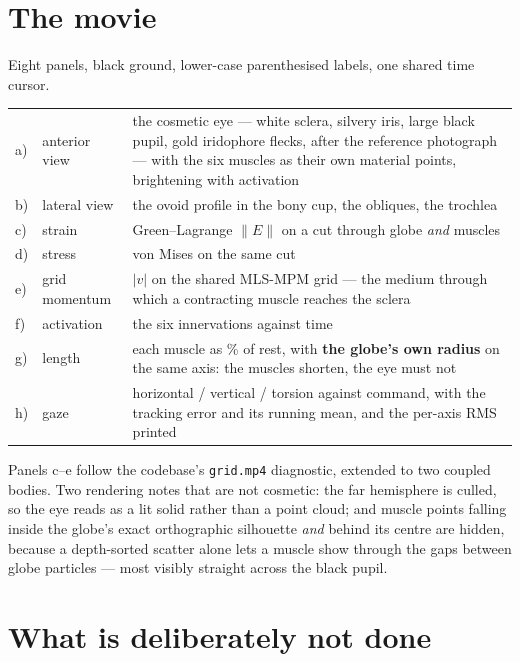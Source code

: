 \documentclass[11pt,a4paper]{article}
\newcommand{\code}[1]{\texttt{#1}}
\begin{document}
\section{The movie}

Eight panels, black ground, lower-case parenthesised labels, one shared time cursor.

\begin{center}\small
\begin{tabular}{@{}llp{8.4cm}@{}}
\toprule
a) & anterior view & the cosmetic eye --- white sclera, silvery iris, large black pupil, gold iridophore flecks, after the reference photograph --- with the six muscles as their own material points, brightening with activation \\
b) & lateral view & the ovoid profile in the bony cup, the obliques, the trochlea \\
c) & strain & Green--Lagrange $\|E\|$ on a cut through globe \emph{and} muscles \\
d) & stress & von Mises on the same cut \\
e) & grid momentum & $|v|$ on the shared MLS-MPM grid --- the medium through which a contracting muscle reaches the sclera \\
f) & activation & the six innervations against time \\
g) & length & each muscle as \% of rest, with \textbf{the globe's own radius} on the same axis: the muscles shorten, the eye must not \\
h) & gaze & horizontal / vertical / torsion against command, with the tracking error and its running mean, and the per-axis RMS printed \\
\bottomrule
\end{tabular}
\end{center}

Panels c--e follow the codebase's \code{grid.mp4} diagnostic, extended to two coupled bodies. Two
rendering notes that are not cosmetic: the far hemisphere is culled, so the eye reads as a lit solid
rather than a point cloud; and muscle points falling inside the globe's exact orthographic
silhouette \emph{and} behind its centre are hidden, because a depth-sorted scatter alone lets a
muscle show through the gaps between globe particles --- most visibly straight across the black
pupil.

\section{What is deliberately not done}
\end{document}
